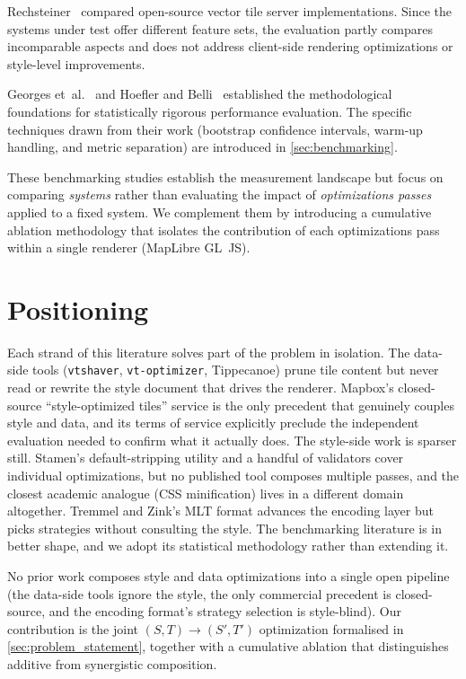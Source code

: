 \begin{sloppypar}
Rechsteiner~\cite{rechsteinerPerformancevergleichOpenSourceVectorTilesServerloesungenZur2024} compared open-source vector tile server implementations.
Since the systems under test offer different feature sets, the evaluation partly compares incomparable aspects and does not address client-side rendering optimizations or style-level improvements.
\end{sloppypar}

Georges et~al.~\cite{georgesStatisticallyRigorousJava2007} and Hoefler and Belli~\cite{hoeflerScientificBenchmarkingParallel2015} established the methodological foundations for statistically rigorous performance evaluation.
The specific techniques drawn from their work (bootstrap confidence intervals, warm-up handling, and metric separation) are introduced in \cref{sec:benchmarking}.

These benchmarking studies establish the measurement landscape but focus on comparing \emph{systems} rather than evaluating the impact of \emph{optimizations passes} applied to a fixed system.
We complement them by introducing a cumulative ablation methodology that isolates the contribution of each optimizations pass within a single renderer (MapLibre GL~JS).

\section{Positioning}\label{sec:rw_positioning}

Each strand of this literature solves part of the problem in isolation.
The data-side tools (\texttt{vtshaver}, \texttt{vt-optimizer}, Tippecanoe) prune tile content but never read or rewrite the style document that drives the renderer.
Mapbox's closed-source \enquote{style-optimized tiles} service is the only precedent that genuinely couples style and data, and its terms of service explicitly preclude the independent evaluation needed to confirm what it actually does.
The style-side work is sparser still.
Stamen's default-stripping utility and a handful of validators cover individual optimizations, but no published tool composes multiple passes, and the closest academic analogue (\ac{CSS} minification) lives in a different domain altogether.
Tremmel and Zink's \ac{MLT} format advances the encoding layer but picks strategies without consulting the style.
The benchmarking literature is in better shape, and we adopt its statistical methodology rather than extending it.

\begin{chaptersummary}
No prior work composes style and data optimizations into a single open pipeline (the data-side tools ignore the style, the only commercial precedent is closed-source, and the encoding format's strategy selection is style-blind).
Our contribution is the joint $(S, T) \to (S', T')$ optimization formalised in \cref{sec:problem_statement}, together with a cumulative ablation that distinguishes additive from synergistic composition.
\end{chaptersummary}

